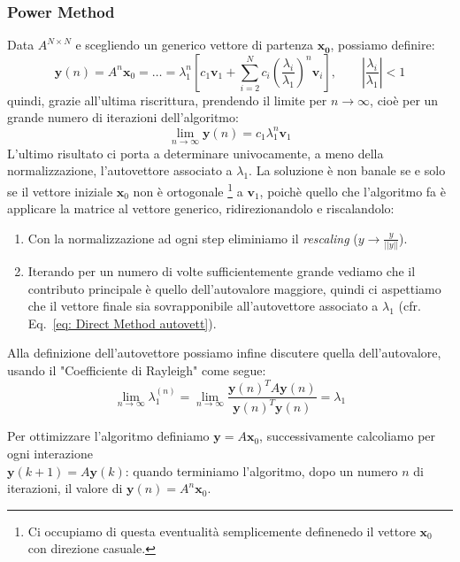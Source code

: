 \documentclass[11pt, a4paper]{article}
\begin{document}
\subsubsection{Power Method}
Data $A^{N\times N}$ e scegliendo un generico vettore di partenza $\boldsymbol{x_0}$, possiamo definire:
\[
\boldsymbol{y}(n) = A^n \boldsymbol x_0 = \dots = \lambda_1^n \left[ c_1 \boldsymbol{v}_1 + \sum_{i=2}^{N} c_i \left( \frac{\lambda_i}{\lambda_1} \right)^n \boldsymbol{v}_i \right], \quad \quad \left| \frac{\lambda_i}{\lambda_1} \right| < 1
\]
quindi, grazie all'ultima riscrittura, prendendo il limite per $n \xrightarrow{} \infty$, cioè per un grande numero di iterazioni dell'algoritmo:
\begin{equation} \label{eq: Direct Method autovett}
\lim_{n \xrightarrow{}\infty} \boldsymbol{y}(n) = c_1 \lambda_1^n \boldsymbol{v}_1
\end{equation}
L'ultimo risultato ci porta a determinare univocamente, a meno della normalizzazione, l'autovettore associato a $\lambda_1$. La soluzione è non banale se e solo se il vettore iniziale $\boldsymbol x_0$ non è ortogonale
\footnote{
Ci occupiamo di questa eventualità semplicemente definenedo il vettore $\boldsymbol x_0$ con direzione casuale.
}
a $\boldsymbol{v}_1$, poichè quello che l'algoritmo fa è applicare la matrice al vettore generico, ridirezionandolo e riscalandolo:
\begin{enumerate}
    \item Con la normalizzazione ad ogni step eliminiamo il \textit{rescaling} ($y \longrightarrow \frac{y}{||y||}$).
    \item Iterando per un numero di volte sufficientemente grande vediamo che il contributo principale è quello dell'autovalore maggiore, quindi ci aspettiamo che il vettore finale sia sovrapponibile all'autovettore associato a $\lambda_1$ (cfr. Eq.~\eqref{eq: Direct Method autovett}).
\end{enumerate}
Alla definizione dell'autovettore possiamo infine discutere quella dell'autovalore, usando il "Coefficiente di Rayleigh" come segue:
\begin{equation} \label{eq: Rayleigh Coeff}
\lim_{n\to\infty} \lambda_1^{(n)} = \lim_{n\to\infty} \frac{\boldsymbol{y}(n)^T A \boldsymbol{y}(n)}{\boldsymbol{y}(n)^T \boldsymbol{y}(n)} = \lambda_1
\end{equation}

\noindent Per ottimizzare l'algoritmo definiamo $\boldsymbol y = A\boldsymbol x_0$, successivamente calcoliamo per ogni interazione\\ $\boldsymbol y(k+1) = A\boldsymbol y(k)$: quando terminiamo l'algoritmo, dopo un numero $n$ di iterazioni, il valore di $\boldsymbol y(n) = A^n \boldsymbol x_0$.\\
\end{document}
